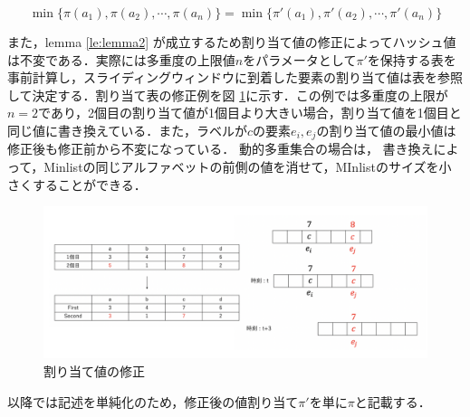 \begin{lemma}
  \label{le:lemma2}
   $$\min\{\pi(a_1),\pi(a_2),\cdots,\pi(a_n)\} = \min\{\pi'(a_1),\pi'(a_2),\cdots,\pi'(a_n)\}$$
  \end{lemma}



また，lemma \ref{le:lemma2}
が成立するため割り当て値の修正によってハッシュ値は不変である．実際には多重度の上限値$n$をパラメータとして$\pi'$を保持する表を事前計算し，スライディングウィンドウに到着した要素の割り当て値は表を参照して決定する．割り当て表の修正例を図 \ref{fig:44}に示す．この例では多重度の上限が$n=2$であり，2個目の割り当て値が1個目より大きい場合，割り当て値を1個目と同じ値に書き換えている．また，ラベルが$c$の要素$e_i,e_j$の割り当て値の最小値は修正後も修正前から不変になっている．
動的多重集合の場合は，
書き換えによって，Minlistの同じアルファベットの前側の値を消せて，MInlistのサイズを小さくすることができる．




\begin{figure}[H]
  \centering
  \includegraphics[width=18cm]{44.png}
    \caption{割り当て値の修正}
    \label{fig:44}
\end{figure}
以降では記述を単純化のため，修正後の値割り当て$\pi'$を単に$\pi$と記載する．
